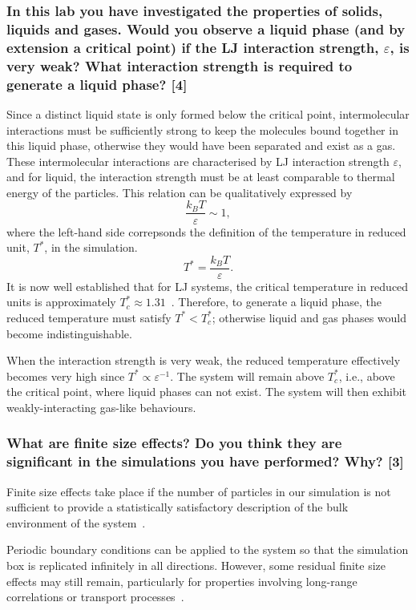 \documentclass[a4paper,10pt,twocolumn]{article}
\begin{document}
\subsubsection*{In this lab you have investigated the properties of solids, liquids and gases. Would you observe a liquid phase (and by extension a critical point) if the LJ interaction strength, $\varepsilon$, is very weak? What interaction strength is required to generate a liquid phase? [4]}

Since a distinct liquid state is only formed below the critical point, intermolecular interactions must be sufficiently strong to keep the molecules bound together in this liquid phase, otherwise they would have been separated and exist as a gas. These intermolecular interactions are characterised by LJ interaction strength $\varepsilon$, and for liquid, the interaction strength must be at least comparable to thermal energy of the particles. This relation can be qualitatively expressed by
\[
\frac{k_BT}{\varepsilon}\sim1,
\]
where the left-hand side correpsonds the definition of the temperature in reduced unit, $T^*$, in the simulation.
\[
T^*=\frac{k_B T}{\varepsilon}.
\]
It is now well established that for LJ systems, the critical temperature in reduced units is approximately $T^*_c\approx1.31$~\cite{perez2006critical}. Therefore, to generate a liquid phase, the reduced temperature must satisfy $T^*<T^*_c$; otherwise liquid and gas phases would become indistinguishable.

When the interaction strength is very weak, the reduced temperature effectively becomes very high since $T^*\propto\varepsilon^{-1}$. The system will remain above $T^*_c$, i.e., above the critical point, where liquid phases can not exist. The system will then exhibit weakly-interacting gas-like behaviours.

\subsubsection*{What are finite size effects? Do you think they are significant in the simulations you have performed? Why? [3]}

Finite size effects take place if the number of particles in our simulation is not sufficient to provide a statistically satisfactory description of the bulk environment of the system~\cite{reible2023finite}. 

Periodic boundary conditions can be applied to the system so that the simulation box is replicated infinitely in all directions. However, some residual finite size effects may still remain, particularly for properties involving long-range correlations or transport processes~\cite{allen2017computer}.
\end{document}
